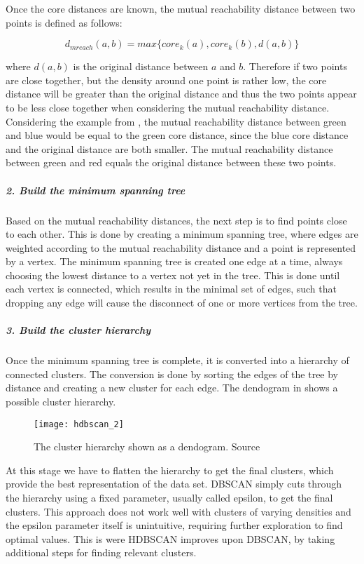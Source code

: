 Once the core distances are known, the mutual reachability distance between two points is defined as follows:

\begin{equation*}
    d_{mreach}(a, b) = max\{core_k(a), core_k(b), d(a, b)\}
\end{equation*}

where $d(a, b)$ is the original distance between $a$ and $b$.
Therefore if two points are close together, but the density around one point is rather low,
the core distance will be greater than the original distance and thus the two points appear to be less close together
when considering the mutual reachability distance. 
Considering the example from ,
the mutual reachability distance between green and blue would be equal to the green core distance, 
since the blue core distance and the original distance are both smaller. 
The mutual reachability distance between green and red equals the original distance between these two points. 

\subparagraph{2. Build the minimum spanning tree}
Based on the mutual reachability distances, the next step is to find points close to each other.
This is done by creating a minimum spanning tree,
where edges are weighted according to the mutual reachability distance and a point is represented by a vertex.
The minimum spanning tree is created one edge at a time,
always choosing the lowest distance to a vertex not yet in the tree.
This is done until each vertex is connected, which results in the minimal set of edges,
such that dropping any edge will cause the disconnect of one or more vertices from the tree.

\subparagraph{3. Build the cluster hierarchy}
Once the minimum spanning tree is complete, it is converted into a hierarchy of connected clusters.
The conversion is done by sorting the edges of the tree by distance 
and creating a new cluster for each edge. 
The dendogram in  shows a possible cluster hierarchy. 

\begin{figure}[h]
    \centering
    \texttt{[image: hdbscan\_2]}
    \caption{
        The cluster hierarchy shown as a dendogram.
        Source\cite{how_hdbscan_works}
    }
    \label{fig:hdbscan_2}
\end{figure}

At this stage we have to flatten the hierarchy to get the final clusters,
which provide the best representation of the data set.
DBSCAN simply cuts through the hierarchy using a fixed parameter, usually called epsilon, to get the final clusters.
This approach does not work well with clusters of varying densities and the epsilon parameter itself is unintuitive,
requiring further exploration to find optimal values.
This is were HDBSCAN improves upon DBSCAN, by taking additional steps for finding relevant clusters.

